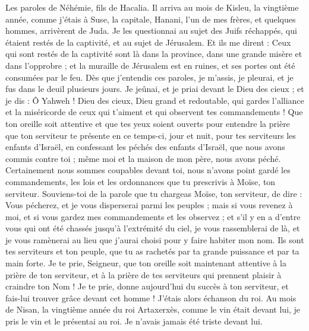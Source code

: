 \BFont
\begin{multicols}{2}
\VerseOne{}Les paroles de Néhémie, fils de Hacalia. Il arriva au mois de Kisleu, la vingtième année, comme j'étais à Suse, la capitale,
Hanani, l'un de mes frères, et quelques hommes, arrivèrent de Juda. Je les questionnai au sujet des Juifs réchappés, qui étaient restés de la captivité, et au sujet de Jérusalem.
Et ils me dirent : Ceux qui sont restés de la captivité sont là dans la province, dans une grande misère et dans l’opprobre ; et la muraille de Jérusalem est en ruines, et ses portes ont été consumées par le feu.
Dès que j’entendis ces paroles, je m'assis, je pleurai, et je fus dans le deuil plusieurs jours. Je jeûnai, et je priai devant le Dieu des cieux ;
 et je dis : Ô Yahweh ! Dieu des cieux, Dieu grand et redoutable, qui gardes l'alliance et la miséricorde de ceux qui t'aiment et qui observent tes commandements !
Que ton oreille soit attentive et que tes yeux soient ouverts pour entendre la prière que ton serviteur te présente en ce temps-ci, jour et nuit, pour tes serviteurs les enfants d'Israël, en confessant les péchés des enfants d'Israël, que nous avons commis contre toi ; même moi et la maison de mon père, nous avons péché.
Certainement nous sommes coupables devant toi, nous n'avons point gardé les commandements, les lois et les ordonnances que tu prescrivis à Moïse, ton serviteur.
Souviens-toi de la parole que tu chargeas Moïse, ton serviteur, de dire : Vous pécherez, et je vous disperserai parmi les peuples ;
mais si vous revenez à moi, et si vous gardez mes commandements et les observez ; et s'il y en a d'entre vous qui ont été chassés jusqu'à l'extrémité du ciel, je vous rassemblerai de là, et je vous ramènerai au lieu que j'aurai choisi pour y faire habiter mon nom.
Ils sont tes serviteurs et ton peuple, que tu as rachetés par ta grande puissance et par ta main forte.
Je te prie, Seigneur, que ton oreille soit maintenant attentive à la prière de ton serviteur, et à la prière de tes serviteurs qui prennent plaisir à craindre ton Nom ! Je te prie, donne aujourd'hui du succès à ton serviteur, et fais-lui trouver grâce devant cet homme ! J'étais alors échanson du roi.
\VerseOne{}Au mois de Nisan, la vingtième année du roi Artaxerxès, comme le vin était devant lui, je pris le vin et le présentai au roi. Je n'avais jamais été triste devant lui.

\end{multicols}
